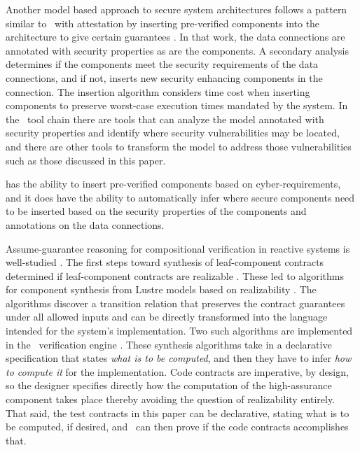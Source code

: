 
Another model based approach to secure system architectures follows a pattern similar to \brfcs\ with attestation by inserting pre-verified components into the architecture to give certain guarantees \cite{6209212}.
In that work, the data connections are annotated with security properties as are the components.
A secondary analysis determines if the components meet the security requirements of the data connections, and if not, inserts new security enhancing components in the connection.
The insertion algorithm considers time cost when inserting components to preserve worst-case execution times mandated by the system.
In the \brfcs\ tool chain there are tools that can analyze the model annotated with security properties and identify where security vulnerabilities may be located, and there are other tools to transform the model to address those vulnerabilities such as those discussed in this paper.

has the ability to insert pre-verified components based on cyber-requirements, and it does have the ability to automatically infer where secure components need to be inserted based on the security properties of the components and annotations on the data connections.

Assume-guarantee reasoning for compositional verification in reactive systems is well-studied \cite{10.1007/978-3-642-28891-3_13, 10.1145/2658982.2527272, 10.1007/978-3-319-17524-9_7}.
The first steps toward synthesis of leaf-component contracts determined if leaf-component contracts are realizable \cite{10.1007/978-3-319-17524-9_13, 10.1007/978-3-319-29613-5_7}.
These led to algorithms for component synthesis from Lustre models based on realizability \cite{katis2017synthesis, 10.1007/978-3-319-89963-3_10}.
The algorithms discover a transition relation that preserves the contract guarantees under all allowed inputs and can be directly transformed into the language intended for the system's implementation.
Two such algorithms are implemented in the \agr\ verification engine \cite{jkind}.
These synthesis algorithms take in a declarative specification that states \emph{what is to be computed}, and then they have to infer \emph{how to compute it} for the implementation.
Code contracts are imperative, by design, so the designer specifies directly how the computation of the high-assurance component takes place thereby avoiding the question of realizability entirely.
That said, the test contracts in this paper can be declarative, stating what is to be computed, if desired, and \agr\ can then prove if the code contracts accomplishes that.

